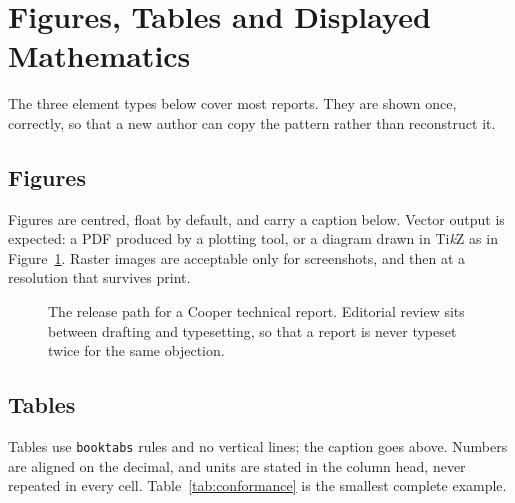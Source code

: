 \section{Figures, Tables and Displayed Mathematics}
\label{sec:elements}

The three element types below cover most reports. They are shown once, correctly, so that a new
author can copy the pattern rather than reconstruct it.

\subsection{Figures}

Figures are centred, float by default, and carry a caption below. Vector output is expected:
a PDF produced by a plotting tool, or a diagram drawn in Ti\emph{k}Z as in
Figure~\ref{fig:pipeline}. Raster images are acceptable only for screenshots, and then at a
resolution that survives print.

\begin{figure}[htbp]
  \centering
  \caption{The release path for a Cooper technical report. Editorial review sits between
  drafting and typesetting, so that a report is never typeset twice for the same objection.}
  \label{fig:pipeline}
\end{figure}

\subsection{Tables}

Tables use \texttt{booktabs} rules and no vertical lines; the caption goes above. Numbers are
aligned on the decimal, and units are stated in the column head, never repeated in every cell.
Table~\ref{tab:conformance} is the smallest complete example.

